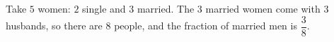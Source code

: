Take $5$ women: $2$ single and $3$ married. The $3$ married women come with $3$ husbands, so there are $8$ people, and the fraction of married men is $\boxed{\dfrac38}$.
